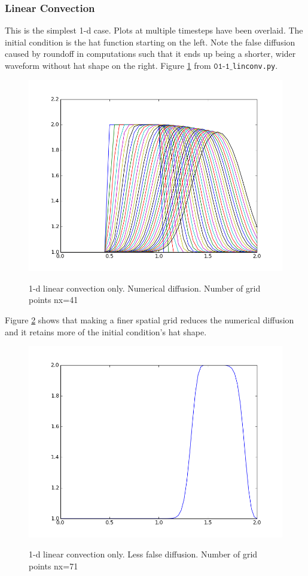 \documentclass[11pt]{article}
\begin{document}
{\subsubsection{Linear Convection}\label{cfl+friends}
This is the simplest 1-d case. Plots at multiple timesteps have been overlaid.
The initial condition is the hat function starting on the left.
Note the false diffusion caused by roundoff in computations such that it ends up being a
shorter, wider waveform without hat shape on the right. Figure \ref{fig:num_diff} from
$\texttt{01-1\_}$\texttt{linconv.py}.

	\begin{figure}[num_diff]
	\centering
	\caption{1-d linear convection only. Numerical diffusion. Number of grid points nx=41}
	\includegraphics[scale=0.8]{num_diff.png}
	\label{fig:num_diff}
	\end{figure}

Figure \ref{fig:num_diff_fine_mesh} shows that making a finer spatial grid reduces the
numerical diffusion and it retains more of the initial condition's hat shape.

	\begin{figure}[num_diff_fine_mesh]
	\centering
	\caption{1-d linear convection only. Less false diffusion. Number of grid points nx=71}
	\includegraphics[scale=0.8]{better_hat.png}
	\label{fig:num_diff_fine_mesh}
	\end{figure}

}
\end{document}

